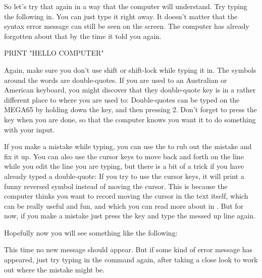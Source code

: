 \needspace{4cm} %

So let's try that again in a way that the computer will understand.  Try typing
  the following in.  You can just type it right away. It doesn't matter that the
  syntax error message can still be seen on the screen.  The computer has already
  forgotten about that by the time it told you  again.

\begin{screenoutput}
PRINT "HELLO COMPUTER"
\end{screenoutput}

Again, make sure you don't use shift or shift-lock while typing it in.  The symbols around
the words  are double-quotes.  If you are used to an Australian or American
keyboard, you might discover that they double-quote key is in a rather different place to
where you are used to:  Double-quotes can be typed on the MEGA65 by holding down the
 key, and then pressing 2.  Don't forget to press the 
key when you are done, so that the computer knows you want it to do something with your input.

If you make a mistake while typing, you can use the  to rub out the mistake
and fix it up.  You can also use the cursor keys to move back and forth on the line while
you edit the line you are typing, but there is a bit of a trick if you have already typed
a double-quote: If you try to use the cursor keys, it will print a funny reversed symbol
instead of moving the cursor.  This is because the computer thinks you want to record
moving the cursor in the text itself, which can be really useful and fun, and which you can
read more about in . But for now, if you
make a mistake just press the  key and type the messed up line again.

\needspace{4cm} %
Hopefully now you will see something like the following:


  This time no new  message should appear. But if some kind
  of error message has appeared, just try typing in the command again, after
  taking a close look to work out where the mistake might be.

